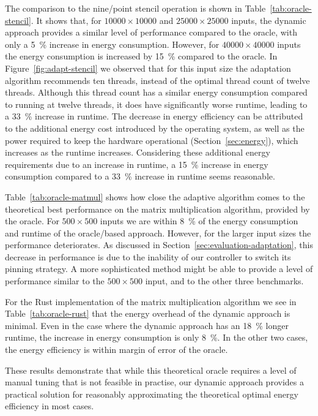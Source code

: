 The comparison to the nine\-/point stencil operation is shown in Table~\ref{tab:oracle-stencil}.
It shows that, for $10000 \times 10000$ and $25000 \times 25000$ inputs, the dynamic approach provides a similar level of performance compared to the oracle, with only a \qty{5}{\percent} increase in energy consumption.
However, for $40000 \times 40000$ inputs the energy consumption is increased by \qty{15}{\percent} compared to the oracle.
In Figure~\ref{fig:adapt-stencil} we observed that for this input size the adaptation algorithm recommends ten threads, instead of the optimal thread count of twelve threads.
Although this thread count has a similar energy consumption compared to running at twelve threads, it does have significantly worse runtime, leading to a \qty{33}{\percent} increase in runtime.
The decrease in energy efficiency can be attributed to the additional energy cost introduced by the operating system, as well as the power required to keep the hardware operational (Section~\ref{sec:energy}), which increases as the runtime increases.
Considering these additional energy requirements due to an increase in runtime, a \qty{15}{\percent} increase in energy consumption compared to a \qty{33}{\percent} increase in runtime seems reasonable.

Table~\ref{tab:oracle-matmul} shows how close the adaptive algorithm comes to the theoretical best performance on the matrix multiplication algorithm, provided by the oracle.
For $500 \times 500$ inputs we are within \qty{8}{\percent} of the energy consumption and runtime of the oracle\-/based approach.
However, for the larger input sizes the performance deteriorates.
As discussed in Section~\ref{sec:evaluation-adaptation}, this decrease in performance is due to the inability of our controller to switch its pinning strategy.
A more sophisticated method might be able to provide a level of performance similar to the $500 \times 500$ input, and to the other three benchmarks.

For the Rust implementation of the matrix multiplication algorithm we see in Table~\ref{tab:oracle-rust} that the energy overhead of the dynamic approach is minimal.
Even in the case where the dynamic approach has an \qty{18}{\percent} longer runtime, the increase in energy consumption is only \qty{8}{\percent}.
In the other two cases, the energy efficiency is within margin of error of the oracle.

These results demonstrate that while this theoretical oracle requires a level of manual tuning that is not feasible in practise, our dynamic approach provides a practical solution for reasonably approximating the theoretical optimal energy efficiency in most cases.

